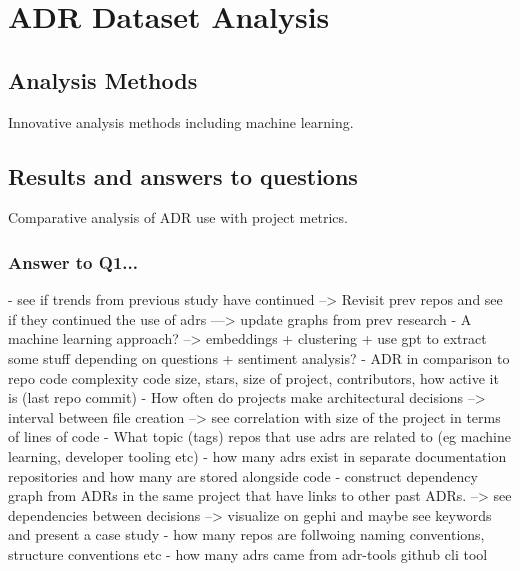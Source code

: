 \chapter{ADR Dataset Analysis}
    \section{Analysis Methods}
        Innovative analysis methods including machine learning.
    \section{Results and answers to questions}
        Comparative analysis of ADR use with project metrics.
        \subsection{Answer to Q1...}
        - see if trends from previous study have continued --> Revisit prev repos and see if they continued the use of adrs ---> update graphs from prev research
        - A machine learning approach? --> embeddings + clustering + use gpt to extract some stuff depending on questions + sentiment analysis? 
        -  ADR in comparison to repo code complexity code size, stars, size of project, contributors, how active it is (last repo commit)
        - How often do projects make architectural decisions --> interval between file creation --> see correlation with size of the project in terms of lines of code
        - What topic (tags) repos that use adrs are related to (eg machine learning, developer tooling etc) 
        - how many adrs exist in separate documentation repositories and how many are stored alongside code
        - construct dependency graph from ADRs in the same project that have links to other past ADRs. --> see dependencies between decisions --> visualize on gephi and maybe see keywords and present a case study
        - how many repos are follwoing naming conventions, structure conventions etc    
        - how many adrs came from adr-tools github cli tool 